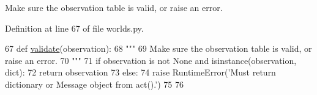 \begin{DoxyVerb}Make sure the observation table is valid, or raise an error.
\end{DoxyVerb}
 

Definition at line 67 of file worlds.\+py.


\begin{DoxyCode}
67 \textcolor{keyword}{def }\hyperlink{namespaceparlai_1_1core_1_1worlds_afc3fad603b7bce41dbdc9cdc04a9c794}{validate}(observation):
68     \textcolor{stringliteral}{"""}
69 \textcolor{stringliteral}{    Make sure the observation table is valid, or raise an error.}
70 \textcolor{stringliteral}{    """}
71     \textcolor{keywordflow}{if} observation \textcolor{keywordflow}{is} \textcolor{keywordflow}{not} \textcolor{keywordtype}{None} \textcolor{keywordflow}{and} isinstance(observation, dict):
72         \textcolor{keywordflow}{return} observation
73     \textcolor{keywordflow}{else}:
74         \textcolor{keywordflow}{raise} RuntimeError(\textcolor{stringliteral}{'Must return dictionary or Message object from act().'})
75 
76 
\end{DoxyCode}
